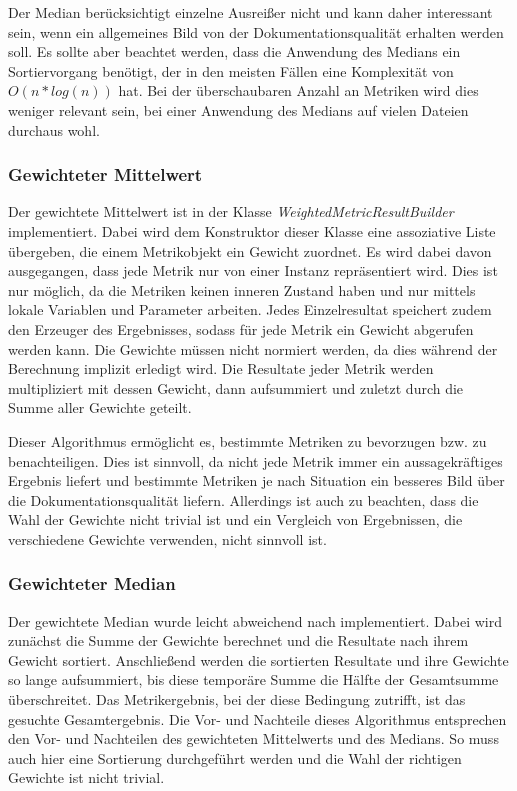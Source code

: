 Der Median berücksichtigt einzelne Ausreißer nicht und kann daher interessant sein, wenn ein allgemeines Bild von der Dokumentationsqualität erhalten werden soll. Es sollte aber beachtet werden, dass die Anwendung des Medians ein Sortiervorgang benötigt, der in den meisten Fällen eine Komplexität von $O(n*log(n))$ hat. Bei der überschaubaren Anzahl an Metriken wird dies weniger relevant sein, bei einer Anwendung des Medians auf vielen Dateien durchaus wohl.


\subsubsection{Gewichteter Mittelwert}
Der gewichtete Mittelwert ist in der Klasse \textit{WeightedMetricResultBuilder} implementiert. Dabei wird dem Konstruktor dieser Klasse eine assoziative Liste übergeben, die einem Metrikobjekt ein Gewicht zuordnet.  Es wird dabei davon ausgegangen, dass jede Metrik nur von einer Instanz repräsentiert wird. Dies ist nur möglich, da die Metriken keinen inneren Zustand haben und nur mittels lokale Variablen und Parameter arbeiten. Jedes Einzelresultat speichert zudem den Erzeuger des Ergebnisses, sodass für jede Metrik ein Gewicht abgerufen werden kann. Die Gewichte müssen nicht normiert werden, da dies während der Berechnung implizit erledigt wird. Die Resultate jeder Metrik werden multipliziert mit dessen Gewicht, dann aufsummiert und zuletzt durch die Summe aller Gewichte geteilt. 


Dieser Algorithmus ermöglicht es, bestimmte Metriken zu bevorzugen bzw. zu benachteiligen. Dies ist sinnvoll, da nicht jede Metrik immer ein aussagekräftiges Ergebnis liefert und bestimmte Metriken je nach Situation ein besseres Bild über die Dokumentationsqualität liefern. Allerdings ist auch zu beachten, dass die Wahl der Gewichte nicht trivial ist und ein Vergleich von Ergebnissen, die verschiedene Gewichte verwenden, nicht sinnvoll ist.

\subsubsection{Gewichteter Median}
Der gewichtete Median wurde leicht abweichend nach \cite[S. 37]{YAGER199835} implementiert. Dabei wird zunächst die Summe der Gewichte berechnet und die Resultate nach ihrem Gewicht sortiert. Anschließend werden die sortierten Resultate und ihre Gewichte so lange aufsummiert, bis diese temporäre Summe die Hälfte der Gesamtsumme überschreitet. Das Metrikergebnis, bei der diese Bedingung zutrifft, ist das gesuchte Gesamtergebnis. Die Vor- und Nachteile dieses Algorithmus entsprechen den Vor- und Nachteilen des gewichteten Mittelwerts und des Medians. So muss auch hier eine Sortierung durchgeführt werden und die Wahl der richtigen Gewichte ist nicht trivial. 


